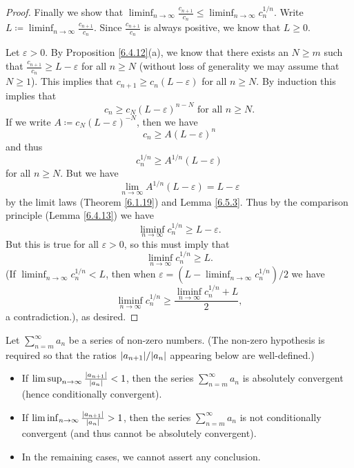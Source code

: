 \begin{proof}
    Finally we show that \(\liminf_{n \to \infty} \frac{c_{n + 1}}{c_n} \leq \liminf_{n \to \infty} c_n^{1 / n}\).
    Write \(L \coloneqq \liminf_{n \to \infty} \frac{c_{n + 1}}{c_n}\).
    Since \(\frac{c_{n + 1}}{c_n}\) is always positive, we know that \(L \geq 0\).

    Let \(\varepsilon > 0\).
    By Proposition \ref{6.4.12}(a), we know that there exists an \(N \geq m\) such that \(\frac{c_{n + 1}}{c_n} \geq L - \varepsilon\) for all \(n \geq N\)
    (without loss of generality we may assume that \(N \geq 1\)).
    This implies that \(c_{n + 1} \geq c_n (L - \varepsilon)\) for all \(n \geq N\).
    By induction this implies that
    \[
        c_n \geq c_N (L - \varepsilon)^{n - N} \text{ for all } n \geq N.
    \]
    If we write \(A \coloneqq c_N (L - \varepsilon)^{-N}\), then we have
    \[
        c_n \geq A(L - \varepsilon)^n
    \]
    and thus
    \[
        c_n^{1 / n} \geq A^{1 / n} (L - \varepsilon)
    \]
    for all \(n \geq N\).
    But we have
    \[
        \lim_{n \to \infty} A^{1 / n} (L - \varepsilon) = L - \varepsilon
    \]
    by the limit laws (Theorem \ref{6.1.19}) and Lemma \ref{6.5.3}.
    Thus by the comparison principle (Lemma \ref{6.4.13}) we have
    \[
        \liminf_{n \to \infty} c_n^{1 / n} \geq L - \varepsilon.
    \]
    But this is true for all \(\varepsilon > 0\), so this must imply that
    \[
        \liminf_{n \to \infty} c_n^{1 / n} \geq L.
    \]
    (If \(\liminf_{n \to \infty} c_n^{1 / n} < L\), then when \(\varepsilon = (L - \liminf_{n \to \infty} c_n^{1 / n}) / 2\) we have
    \[
        \liminf_{n \to \infty} c_n^{1 / n} \geq \frac{\liminf_{n \to \infty} c_n^{1 / n} + L}{2},
    \]
    a contradiction.), as desired.
\end{proof}

\begin{corollary}\label{7.5.3}
    Let \(\sum_{n = m}^\infty a_n\) be a series of non-zero numbers.
    (The non-zero hypothesis is required so that the ratios \(\abs{a_{n + 1}} / \abs{a_n}\) appearing below are well-defined.)
    \begin{itemize}
        \item If \(\limsup_{n \to \infty} \frac{\left\lvert a_{n + 1}\right\rvert}{\left\lvert a_n\right\rvert} < 1\), then the series \(\sum_{n = m}^\infty a_n\) is absolutely convergent (hence conditionally convergent).
        \item If \(\liminf_{n \to \infty} \frac{\left\lvert a_{n + 1}\right\rvert}{\left\lvert a_n\right\rvert} > 1\), then the series \(\sum_{n = m}^\infty a_n\) is not conditionally convergent (and thus cannot be absolutely convergent).
        \item In the remaining cases, we cannot assert any conclusion.
    \end{itemize}
\end{corollary}

